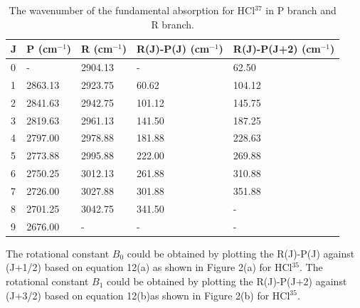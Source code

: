\documentclass[twocolumn]{article} %
\begin{document}
\begin{table}[h]
    \caption{The wavenumber of the fundamental absorption for HCl$^{37}$ in P branch and R branch.}
    \begin{tabular}{L{.1in}C{.7in}C{.7in}C{.7in}C{.8in}}\toprule
        J & P (cm$^{-1}$)      & R     (cm$^{-1}$)  & R(J)-P(J) (cm$^{-1}$)& R(J)-P(J+2) (cm$^{-1}$)\\ & - & 2904.13 &       -   & 62.50       \\
        1 & 2863.13 & 2923.75 & 60.62     & 104.12      \\
        2 & 2841.63 & 2942.75 & 101.12    & 145.75      \\
        3 & 2819.63 & 2961.13 & 141.50    & 187.25      \\
        4 & 2797.00 & 2978.88 & 181.88    & 228.63      \\
        5 & 2773.88 & 2995.88 & 222.00    & 269.88      \\
        6 & 2750.25 & 3012.13 & 261.88    & 310.88      \\
        7 & 2726.00 & 3027.88 & 301.88    & 351.88      \\
        8 & 2701.25 & 3042.75 & 341.50    &    -    \\
        9 & 2676.00 &     -   &    -      &    - \\\bottomrule
    \end{tabular}
\end{table}

The rotational constant $B_0$ could be obtained by plotting the R(J)-P(J) against (J+1/2) based on equation 12(a) as shown in Figure 2(a) for HCl$^{35}$. The rotational constant $B_1$ could be obtained by plotting the R(J)-P(J+2) against (J+3/2) based on equation 12(b)as shown in Figure 2(b) for HCl$^{35}$. 
\end{document}
